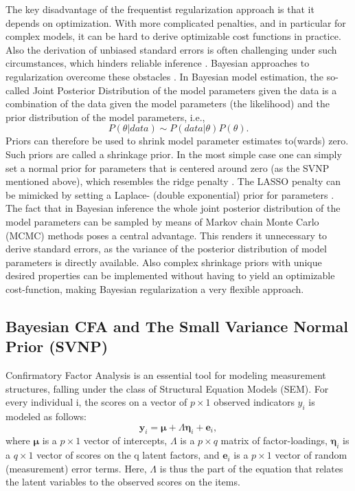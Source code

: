 \documentclass[]{interact}
\theoremstyle{plain}%
\theoremstyle{definition}
\theoremstyle{remark}
\begin{document}
The key disadvantage of the frequentist regularization approach is that
it depends on optimization. With more complicated penalties, and in
particular for complex models, it can be hard to derive optimizable cost
functions in practice. Also the derivation of unbiased standard errors
is often challenging under such circumstances, which hinders reliable
inference \citep{jacobucci_regularized_2016, jacobucci_comparison_2018}.
Bayesian approaches to regularization overcome these obstacles
\citep{jacobucci_comparison_2018}. In Bayesian model estimation, the
so-called Joint Posterior Distribution of the model parameters given the
data is a combination of the data given the model parameters (the
likelihood) and the prior distribution of the model parameters, i.e.,
\[P({\theta} | data) \sim  P(data | \theta) P(\theta) .\] Priors can
therefore be used to shrink model parameter estimates to(wards) zero.
Such priors are called a shrinkage prior. In the most simple case one
can simply set a normal prior for parameters that is centered around
zero (as the SVNP mentioned above), which resembles the ridge penalty
\citep{hsiang_bayesian_1975}. The LASSO penalty can be mimicked by
setting a Laplace- (double exponential) prior for parameters
\citetext{\citealp{park_bayesian_2008}; \citealp{hans_bayesian_2009}; \citealp[see][
for the Bayesian equivalents of other relevant
penalties]{van_erp_shrinkage_2019}}. The fact that in Bayesian inference
the whole joint posterior distribution of the model parameters can be
sampled by means of Markov chain Monte Carlo (MCMC) methods poses a
central advantage. This renders it unnecessary to derive standard
errors, as the variance of the posterior distribution of model
parameters is directly available. Also complex shrinkage priors with
unique desired properties can be implemented without having to yield an
optimizable cost-function, making Bayesian regularization a very
flexible approach.

\hypertarget{bayesian-cfa-and-the-small-variance-normal-prior-svnp}{%
\subsection{Bayesian CFA and The Small Variance Normal Prior
(SVNP)}\label{bayesian-cfa-and-the-small-variance-normal-prior-svnp}}

Confirmatory Factor Analysis \citep[CFA,][]{bollen_structural_1989} is
an essential tool for modeling measurement structures, falling under the
class of Structural Equation Models (SEM). For every individual i, the
scores on a vector of \(p \times 1\) observed indicators \(y_i\) is
modeled as follows:
\[\boldsymbol{y}_i = \boldsymbol{\mu} + \Lambda \boldsymbol{\eta}_i + \boldsymbol{e}_i ,\]
where \(\boldsymbol{\mu}\) is a \(p \times 1\) vector of intercepts,
\(\Lambda\) is a \(p \times q\) matrix of factor-loadings,
\(\boldsymbol{\eta}_i\) is a \(q \times 1\) vector of scores on the q
latent factors, and \(\boldsymbol{e}_i\) is a \(p \times 1\) vector of
random (measurement) error terms. Here, \(\Lambda\) is thus the part of
the equation that relates the latent variables to the observed scores on
the items.
\end{document}

